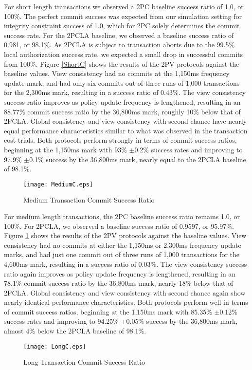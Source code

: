 \documentclass[11pt]{article}
\begin{document}
For short length transactions we observed a 2PC baseline success ratio of 1.0, or 100\%. The perfect commit success was expected from our simulation setting for integrity constraint success of 1.0, which for 2PC solely determines the commit success rate. For the 2PCLA baseline, we observed a baseline success ratio of 0.981, or 98.1\%. As 2PCLA is subject to transaction aborts due to the 99.5\% local authorization success rate, we expected a small drop in successful commits from 100\%. Figure \ref{ShortC} shows the results of the 2PV protocols against the baseline values. View consistency had no commits at the 1,150ms frequency update mark, and had only six commits out of three runs of 1,000 transactions for the 2,300ms mark, resulting in a success ratio of 0.43\%. The view consistency success ratio improves as policy update frequency is lengthened, resulting in an 88.77\% commit success ratio by the 36,800ms mark, roughly 10\% below that of 2PCLA. Global consistency and view consistency with second chance have nearly equal performance characteristics similar to what was observed in the transaction cost trials. Both protocols perform strongly in terms of commit success ratios, beginning at the 1,150ms mark with 93\% $\pm$0.2\% success rates and improving to 97.9\% $\pm$0.1\% success by the 36,800ms mark, nearly equal to the 2PCLA baseline of 98.1\%.
\begin{figure}[h]
\begin{center}
\texttt{[image: MediumC.eps]}
\caption{Medium Transaction Commit Success Ratio}
\label{MediumC}
\end{center}
\end{figure}

For medium length transactions, the 2PC baseline success ratio remains 1.0, or 100\%. For 2PCLA, we observed a baseline success ratio of 0.9597, or 95.97\%. Figure \ref{MediumC} shows the results of the 2PV protocols against the baseline values. View consistency had no commits at either the 1,150ms or 2,300ms frequency update marks, and had just one commit out of three runs of 1,000 transactions for the 4,600ms mark, resulting in a success ratio of 0.03\%. The view consistency success ratio again improves as policy update frequency is lengthened, resulting in an 78.1\% commit success ratio by the 36,800ms mark, nearly 18\% below that of 2PCLA. Global consistency and view consistency with second chance again show nearly identical performance characteristics. Both protocols perform well in terms of commit success ratios, beginning at the 1,150ms mark with 85.35\% $\pm$0.12\% success rates and improving to 94.25\% $\pm$0.05\% success by the 36,800ms mark, almost 4\% below the 2PCLA baseline of 98.1\%.
\begin{figure}[h]
\begin{center}
\texttt{[image: LongC.eps]}
\caption{Long Transaction Commit Success Ratio}
\label{LongC}
\end{center}
\end{figure}
\end{document}
